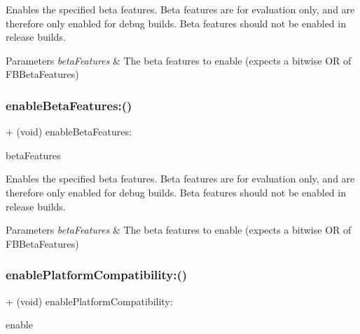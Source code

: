Enables the specified beta features. Beta features are for evaluation only, and are therefore only enabled for debug builds. Beta features should not be enabled in release builds.


\begin{DoxyParams}{Parameters}
{\em beta\+Features} & The beta features to enable (expects a bitwise OR of F\+B\+Beta\+Features) \\
\hline
\end{DoxyParams}
\mbox{\label{interfaceFBSettings_a9ce6bc977fc54c59ba5cacf56922ccac}} 
\subsubsection{\texorpdfstring{enable\+Beta\+Features\+:()}{enableBetaFeatures:()}\hspace{0.1cm}{\footnotesize\ttfamily [5/5]}}
{\footnotesize\ttfamily + (void) enable\+Beta\+Features\+: \begin{DoxyParamCaption}\item[{(N\+S\+U\+Integer)}]{beta\+Features }\end{DoxyParamCaption}}

Enables the specified beta features. Beta features are for evaluation only, and are therefore only enabled for debug builds. Beta features should not be enabled in release builds.


\begin{DoxyParams}{Parameters}
{\em beta\+Features} & The beta features to enable (expects a bitwise OR of F\+B\+Beta\+Features) \\
\hline
\end{DoxyParams}
\mbox{\label{interfaceFBSettings_a896c1bdd4227035fba49c90d06c101a2}} 
\subsubsection{\texorpdfstring{enable\+Platform\+Compatibility\+:()}{enablePlatformCompatibility:()}\hspace{0.1cm}{\footnotesize\ttfamily [1/5]}}
{\footnotesize\ttfamily + (void) enable\+Platform\+Compatibility\+: \begin{DoxyParamCaption}\item[{(B\+O\+OL)}]{enable }\end{DoxyParamCaption}}

